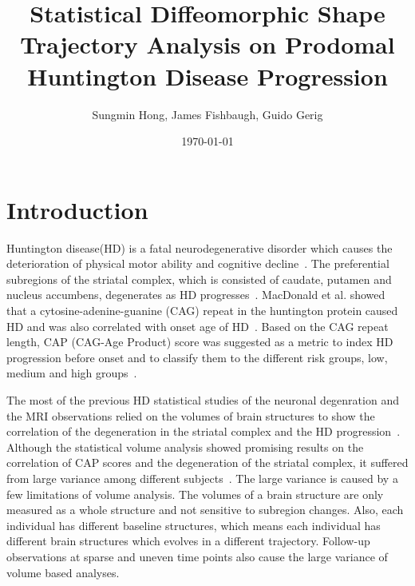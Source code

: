 \documentclass[10pt]{article}
\begin{document}
\title{Statistical Diffeomorphic Shape Trajectory Analysis on Prodomal Huntington Disease Progression}
\author{Sungmin Hong, James Fishbaugh, Guido Gerig}
\date{\today}
\maketitle

\section*{Introduction}

% 

Huntington disease(HD) is a fatal neurodegenerative disorder which causes the deterioration of physical motor ability and cognitive decline~\cite{Paulson2011, Imarisio2008}. 
The preferential subregions of the striatal complex, which is consisted of caudate, putamen and nucleus accumbens, degenerates as HD progresses~\cite{Ferrante1987a, Vonsattel1985}. 
MacDonald et al. showed that a cytosine-adenine-guanine (CAG) repeat in the huntington protein caused HD and was also correlated with onset age of HD~\cite{MacDonald93}. 
Based on the CAG repeat length, CAP (CAG-Age Product) score was suggested as a metric to index HD progression before onset and to classify them to the different risk groups, low, medium and high groups~\cite{Langbehn2010, Zhang2011}. 

The most of the previous HD statistical studies of the neuronal degenration and the MRI observations 
relied on the volumes of brain structures to show the correlation of the degeneration in 
the striatal complex and the HD progression~\cite{Paulsen2014, Younes2014, Paulsen2014C}. 
Although the statistical volume analysis showed promising results on the correlation of CAP scores and the degeneration of the striatal complex, 
it suffered from large variance among different subjects~\cite{Paulsen2014C}. The large variance is caused by a few limitations of volume analysis.
The volumes of a brain structure are only measured as a whole structure and not sensitive to subregion changes. 
Also, each individual has different baseline structures, which means each individual has different brain structures which evolves in a different trajectory. 
Follow-up observations at sparse and uneven time points also cause the large variance of volume based analyses.
\end{document}
